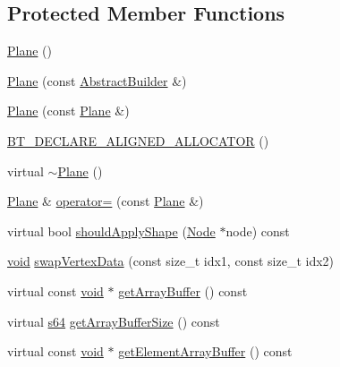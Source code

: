 \subsection*{Protected Member Functions}
\begin{DoxyCompactItemize}
\item 
\mbox{\hyperlink{classnjli_1_1_plane_a076eefa748e73d4740b3478b8893c31d}{Plane}} ()
\item 
\mbox{\hyperlink{classnjli_1_1_plane_aae78e01991506fd8ac864ab6c707f3df}{Plane}} (const \mbox{\hyperlink{classnjli_1_1_abstract_builder}{Abstract\+Builder}} \&)
\item 
\mbox{\hyperlink{classnjli_1_1_plane_a42dc655613f12dbe9b7285e82e43e15a}{Plane}} (const \mbox{\hyperlink{classnjli_1_1_plane}{Plane}} \&)
\item 
\mbox{\hyperlink{classnjli_1_1_plane_a258b4f6236afdeb8a1fc64090853dd1d}{B\+T\+\_\+\+D\+E\+C\+L\+A\+R\+E\+\_\+\+A\+L\+I\+G\+N\+E\+D\+\_\+\+A\+L\+L\+O\+C\+A\+T\+OR}} ()
\item 
virtual \mbox{\hyperlink{classnjli_1_1_plane_a187cf89bb3ede3ac17801ae25c1f722b}{$\sim$\+Plane}} ()
\item 
\mbox{\hyperlink{classnjli_1_1_plane}{Plane}} \& \mbox{\hyperlink{classnjli_1_1_plane_a551051db5631112ed3bdcd68b49263cf}{operator=}} (const \mbox{\hyperlink{classnjli_1_1_plane}{Plane}} \&)
\item 
virtual bool \mbox{\hyperlink{classnjli_1_1_plane_a0ba9fe9f6a03a8438d6204520776250b}{should\+Apply\+Shape}} (\mbox{\hyperlink{classnjli_1_1_node}{Node}} $\ast$node) const
\item 
\mbox{\hyperlink{_thread_8h_af1e856da2e658414cb2456cb6f7ebc66}{void}} \mbox{\hyperlink{classnjli_1_1_plane_a238e9b9a68bf90b6e7a90119fe852da7}{swap\+Vertex\+Data}} (const size\+\_\+t idx1, const size\+\_\+t idx2)
\item 
virtual const \mbox{\hyperlink{_thread_8h_af1e856da2e658414cb2456cb6f7ebc66}{void}} $\ast$ \mbox{\hyperlink{classnjli_1_1_plane_a134447dc787dab9269e68f8011e2973f}{get\+Array\+Buffer}} () const
\item 
virtual \mbox{\hyperlink{_util_8h_a4258bfb2c3a440d06c4aaa3c2b450dde}{s64}} \mbox{\hyperlink{classnjli_1_1_plane_ad7e4c804fee51739e0696e34c7146a3a}{get\+Array\+Buffer\+Size}} () const
\item 
virtual const \mbox{\hyperlink{_thread_8h_af1e856da2e658414cb2456cb6f7ebc66}{void}} $\ast$ \mbox{\hyperlink{classnjli_1_1_plane_a13ae025d91ca2ef639d1ba4e92b5ccc5}{get\+Element\+Array\+Buffer}} () const
\item 

\end{DoxyCompactItemize}
